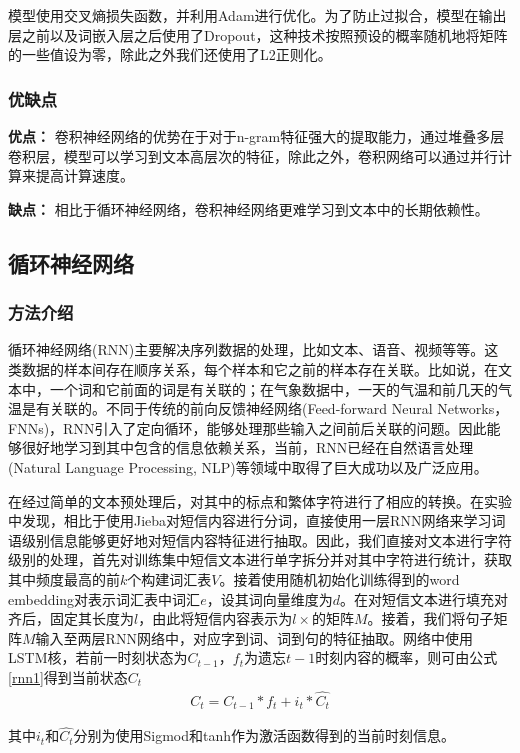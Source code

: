 \documentclass[a4paper]{article}
\begin{document}
模型使用交叉熵损失函数，并利用Adam\cite{kingma2014adam}进行优化。为了防止过拟合，模型在输出层之前以及词嵌入层之后使用了Dropout\cite{hinton2012improving}，这种技术按照预设的概率随机地将矩阵的一些值设为零，除此之外我们还使用了L2正则化。

\subsubsection{优缺点}
\textbf{优点：}
卷积神经网络的优势在于对于n-gram特征强大的提取能力，通过堆叠多层卷积层，模型可以学习到文本高层次的特征，除此之外，卷积网络可以通过并行计算来提高计算速度。

\textbf{缺点：}
相比于循环神经网络，卷积神经网络更难学习到文本中的长期依赖性。

\subsection{循环神经网络}
\subsubsection{方法介绍}
循环神经网络(RNN)主要解决序列数据的处理，比如文本、语音、视频等等。这类数据的样本间存在顺序关系，每个样本和它之前的样本存在关联。比如说，在文本中，一个词和它前面的词是有关联的；在气象数据中，一天的气温和前几天的气温是有关联的。不同于传统的前向反馈神经网络(Feed-forward Neural Networks，FNNs)，RNN引入了定向循环，能够处理那些输入之间前后关联的问题。因此能够很好地学习到其中包含的信息依赖关系，当前，RNN已经在自然语言处理(Natural Language Processing, NLP)等领域中取得了巨大成功以及广泛应用。

在经过简单的文本预处理后，对其中的标点和繁体字符进行了相应的转换。在实验中发现，相比于使用Jieba对短信内容进行分词，直接使用一层RNN网络来学习词语级别信息能够更好地对短信内容特征进行抽取。因此，我们直接对文本进行字符级别的处理，首先对训练集中短信文本进行单字拆分并对其中字符进行统计，获取其中频度最高的前$k$个构建词汇表$V$。接着使用随机初始化训练得到的word embedding对表示词汇表中词汇$e$，设其词向量维度为$d$。在对短信文本进行填充对齐后，固定其长度为$l$，由此将短信内容表示为$l\times $的矩阵$M$。接着，我们将句子矩阵$M$输入至两层RNN网络中，对应字到词、词到句的特征抽取。网络中使用LSTM核，若前一时刻状态为$C_{t-1}$，$f_t$为遗忘$t-1$时刻内容的概率，则可由公式\eqref{rnn1}得到当前状态$C_t$
\begin{align}\label{rnn1}
    C_t = C_{t-1} * f_t + i_t*\hat{C_t}
\end{align}

其中$i_t$和$\hat{C_t}$分别为使用Sigmod和tanh作为激活函数得到的当前时刻信息。
\end{document}
